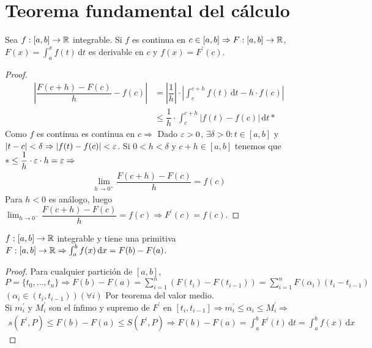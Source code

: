 \section{Teorema fundamental del cálculo}

\begin{theorem}
  Sea \(f: [a, b] \to \mathbb{R} \) integrable. Si \(f\) es continua en \(c \in [a, b] \Rightarrow F: [a, b] \to \mathbb{R} \), \(F(x) = \int_a^x f(t)\, \mathrm{d}t\) es derivable en \(c\) y \(f(x) = F^{\prime}(c)\).
  \begin{proof}
    \begin{align*}
      \left| \dfrac{F(c+h) - F(c)}{h} - f(c) \right| & = |\dfrac{1}{h}| \cdot \left| \int_c^{c+h} f(t)\, \mathrm{d}t - h \cdot f(c) \right| \\
                                                     & \leq \dfrac{1}{h} \cdot \int_c^{c+h}| f(t) - f(c) | \, \mathrm{d}t *
    \end{align*}
    Como \(f\) es continua es continua en \(c \Rightarrow \) Dado \(\varepsilon > 0\), \(\exists \delta > 0 : t \in [a, b]\) y \(|t-c| < \delta \Rightarrow |f(t) - f(c)| < \varepsilon \).
    Si \(0 < h < \delta \) y \(c+h \in [a, b]\) tenemos que \(* \leq \dfrac{1}{h} \cdot \varepsilon \cdot h = \varepsilon \Rightarrow \) \begin{align*}
      \lim_{h \to 0^+} \dfrac{F(c+h) - F(c)}{h} = f(c)
    \end{align*}
    Para \(h < 0\) es análogo, luego \(\lim_{h \to 0^-} \dfrac{F(c+h) - F(c)}{h} = f(c) \Rightarrow F^{\prime}(c) = f(c)\).
  \end{proof}
\end{theorem}

\begin{corollary}
  \(f: [a, b] \to \mathbb{R} \) integrable y tiene una primitiva \(F: [a, b] \to \mathbb{R} \Rightarrow \int_a^b f(x) \, \mathrm{d}x = F(b) - F(a)\).
  \begin{proof}
    Para cualquier partición de \([a, b]\), \(P = \{ t_0, \ldots, t_n \} \Rightarrow F(b) - F(a) = \sum_{i = 1}^n (F(t_i) - F(t_{i-1})) = \sum_{i = 1}^n F(\alpha_i) (t_i - t_{i-1})\) \((\alpha_i \in (t_i, t_{i-1}))(\forall i)\) Por teorema del valor medio. \\
    Si \(m_i^{\prime} \) y \(M_i^{\prime} \) son el ínfimo y supremo de \(F^{\prime} \) en \([t_i, t_{i-1}] \Rightarrow m_i^{\prime} \leq \alpha_i \leq M_i^{\prime} \Rightarrow \)\
    \begin{align*}
      s(F^{\prime}, P) \leq F(b) - F(a) \leq S(F^{\prime}, P) \Rightarrow F(b) - F(a) = \int_a^b F^{\prime}(t) \, \mathrm{d}t = \int_a^b f(x) \, \mathrm{d}x
    \end{align*}
  \end{proof}
\end{corollary}

